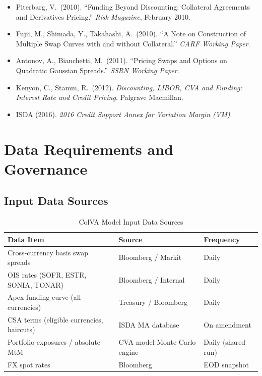 \documentclass[11pt,a4paper]{article}
\begin{document}
\begin{itemize}[leftmargin=*]
  \item Piterbarg, V.\ (2010). ``Funding Beyond Discounting: Collateral Agreements and Derivatives Pricing.'' \textit{Risk Magazine}, February 2010.
  \item Fujii, M., Shimada, Y., Takahashi, A.\ (2010). ``A Note on Construction of Multiple Swap Curves with and without Collateral.'' \textit{CARF Working Paper}.
  \item Antonov, A., Bianchetti, M.\ (2011). ``Pricing Swaps and Options on Quadratic Gaussian Spreads.'' \textit{SSRN Working Paper}.
  \item Kenyon, C., Stamm, R.\ (2012). \textit{Discounting, LIBOR, CVA and Funding: Interest Rate and Credit Pricing}. Palgrave Macmillan.
  \item ISDA (2016). \textit{2016 Credit Support Annex for Variation Margin (VM)}.
\end{itemize}

\section{Data Requirements and Governance}

\subsection{Input Data Sources}

\begin{table}[h!]
\centering
\caption{ColVA Model Input Data Sources}
\begin{tabular}{@{}lll@{}}
\toprule
\textbf{Data Item} & \textbf{Source} & \textbf{Frequency} \\
\midrule
Cross-currency basis swap spreads      & Bloomberg / Markit             & Daily \\
OIS rates (SOFR, ESTR, SONIA, TONAR)  & Bloomberg / Internal           & Daily \\
Apex funding curve (all currencies)    & Treasury / Bloomberg           & Daily \\
CSA terms (eligible currencies, haircuts) & ISDA MA database            & On amendment \\
Portfolio exposures / absolute MtM     & CVA model Monte Carlo engine   & Daily (shared run) \\
FX spot rates                          & Bloomberg                      & EOD snapshot \\
\bottomrule
\end{tabular}
\end{table}
\end{document}
